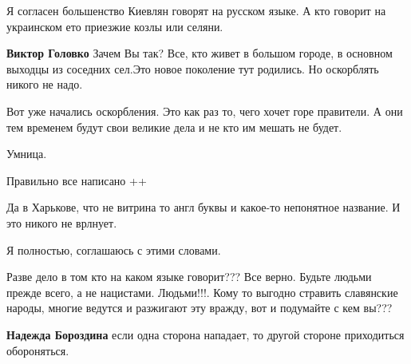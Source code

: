 \begin{itemize}

Я согласен большенство Киевлян говорят на русском языке. А кто говорит на украинском ето приезжие козлы или селяни.

\begin{itemize}

\textbf{Виктор Головко} Зачем Вы так? Все, кто живет в большом городе, в основном выходцы из соседних сел.Это новое поколение тут родились. Но оскорблять никого не надо.

Вот уже начались оскорбления. Это как раз то, чего хочет горе правители. А они тем временем будут свои великие дела и не кто им мешать не будет.
\end{itemize}


Умница.


Правильно все написано ++


Да в Харькове, что не витрина то англ буквы и какое-то непонятное название. И это никого не врлнует.


Я полностью, соглашаюсь с этими словами.



Разве дело в том кто на каком языке говорит??? Все верно. Будьте людьми прежде
всего, а не нацистами. Людьми!!!. Кому то выгодно стравить славянские народы,
многие ведутся и разжигают эту вражду, вот и подумайте с кем вы???

\begin{itemize}

\textbf{Надежда Бороздина} если одна сторона нападает, то другой стороне приходиться обороняться.
\end{itemize}


\end{itemize}
